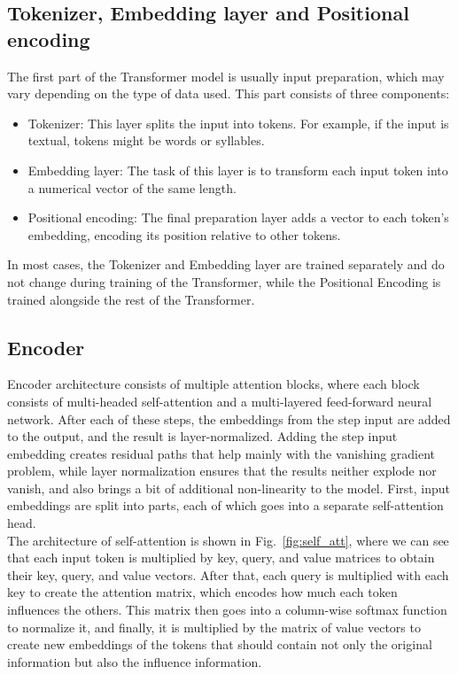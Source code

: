 \subsection{Tokenizer, Embedding layer and Positional encoding}

The first part of the Transformer model is usually input preparation, which may vary depending on the type of data used. This part consists of three components:

\begin{itemize}
	\item Tokenizer: This layer splits the input into tokens. For example, if the input is textual, tokens might be words or syllables.
	\item Embedding layer: The task of this layer is to transform each input token into a numerical vector of the same length.
	\item Positional encoding: The final preparation layer adds a vector to each token’s embedding, encoding its position relative to other tokens.
\end{itemize}

In most cases, the Tokenizer and Embedding layer are trained separately and do not change during training of the Transformer, while the Positional Encoding is trained alongside the rest of the Transformer.

\subsection{Encoder}
\label{theoryEncoder}

Encoder architecture consists of multiple attention blocks, where each block consists of multi-headed self-attention and a multi-layered feed-forward neural network. After each of these steps, the embeddings from the step input are added to the output, and the result is layer-normalized. Adding the step input embedding creates residual paths that help mainly with the vanishing gradient problem, while layer normalization ensures that the results neither explode nor vanish, and also brings a bit of additional non-linearity to the model. First, input embeddings are split into parts, each of which goes into a separate self-attention head.
\\

The architecture of self-attention is shown in Fig.~\ref{fig:self_att}, where we can see that each input token is multiplied by key, query, and value matrices to obtain their key, query, and value vectors. After that, each query is multiplied with each key to create the attention matrix, which encodes how much each token influences the others. This matrix then goes into a column-wise softmax function to normalize it, and finally, it is multiplied by the matrix of value vectors to create new embeddings of the tokens that should contain not only the original information but also the influence information.
\\

